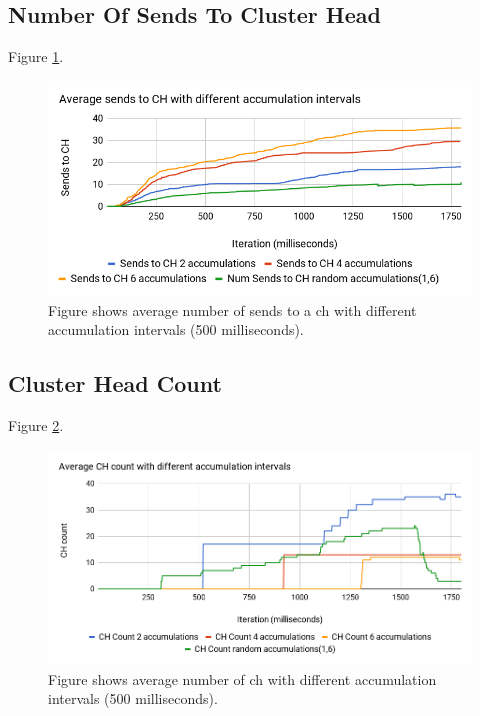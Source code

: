 \documentclass[USenglish]{uit-thesis}
\begin{document}
\subsection{Number Of Sends To Cluster Head}
Figure \ref{fig:sendschChart}.

\begin{figure} [ht]
\centering
\includegraphics[width=\textwidth]{sendschChart.png}
\caption{Figure shows average number of sends to a \gls{ch} with different accumulation intervals (500 milliseconds).}
\label{fig:sendschChart}
\end{figure}


\subsection{Cluster Head Count}

Figure \ref{fig:chCountChart}.

\begin{figure}
\centering
\includegraphics[width=\textwidth]{chCountChart.png}
\caption{Figure shows average number of \gls{ch} with different accumulation intervals (500 milliseconds).}
\label{fig:chCountChart}
\end{figure}
\end{document}
